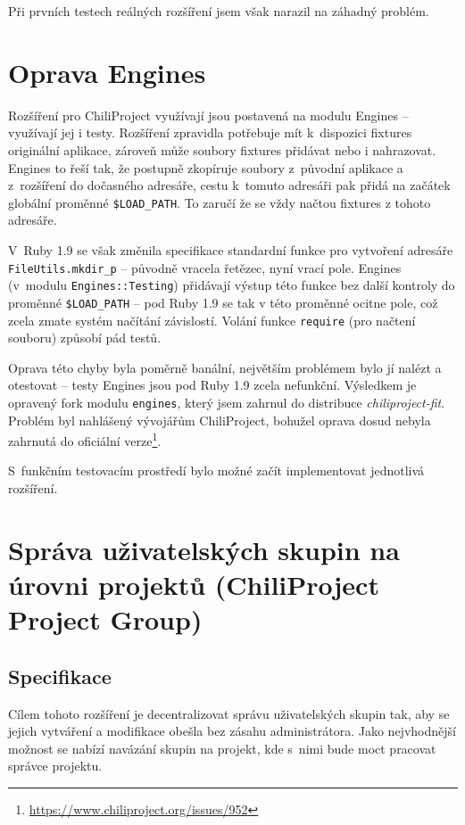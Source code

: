 \documentclass[thesis=B,czech]{FITthesis}[2012/05/02]
\begin{document}
Při prvních testech reálných rozšíření jsem však narazil na záhadný
problém.

\section{Oprava Engines}
\label{sec:oprava-engines}

Rozšíření pro ChiliProject využívají jsou postavená na modulu Engines --
využívají jej i testy. Rozšíření zpravidla potřebuje mít k~dispozici
\gls{fixtures} originální aplikace, zároveň může soubory fixtures
přidávat nebo i nahrazovat. Engines to řeší tak, že postupně zkopíruje
soubory z~původní aplikace a z~rozšíření do dočasného adresáře, cestu
k~tomuto adresáři pak přidá na začátek globální proměnné
\lstinline!$LOAD_PATH!. To zaručí že se vždy načtou fixtures z tohoto
adresáře.

V~Ruby 1.9 se však změnila specifikace standardní funkce pro vytvoření
adresáře \lstinline!FileUtils.mkdir_p! -- původně vracela řetězec, nyní
vrací pole. Engines (v~modulu \lstinline!Engines::Testing!) přidávají
výstup této funkce bez další kontroly do proměnné \lstinline!$LOAD_PATH!
-- pod Ruby 1.9 se tak v této proměnné ocitne pole, což zcela zmate
systém načítání závislostí. Volání funkce \lstinline!require! (pro
načtení souboru) způsobí pád testů.

Oprava této chyby byla poměrně banální, největším problémem bylo jí
nalézt a otestovat -- testy Engines jsou pod Ruby 1.9 zcela nefunkční.
Výsledkem je opravený \gls{fork} modulu \lstinline!engines!, který jsem
zahrnul do distribuce \emph{chiliproject-fit}. Problém byl
nahlášený vývojářům ChiliProject, bohužel oprava dosud nebyla zahrnutá
do oficiální verze\footnote{\url{https://www.chiliproject.org/issues/952}}.

S~funkčním testovacím prostředí bylo možné začít implementovat
jednotlivá rozšíření.

\section[Správa uživatelských skupin na úrovni projektů]{Správa uživatelských skupin na úrovni projektů (ChiliProject
Project Group)}
\label{sec:project_group}

\subsection{Specifikace}

Cílem tohoto rozšíření je decentralizovat správu uživatelských skupin
tak, aby se jejich vytváření a modifikace obešla bez zásahu
administrátora. Jako nejvhodnější možnost se nabízí navázání skupin na
projekt, kde s~nimi bude moct pracovat správce projektu.
\end{document}
